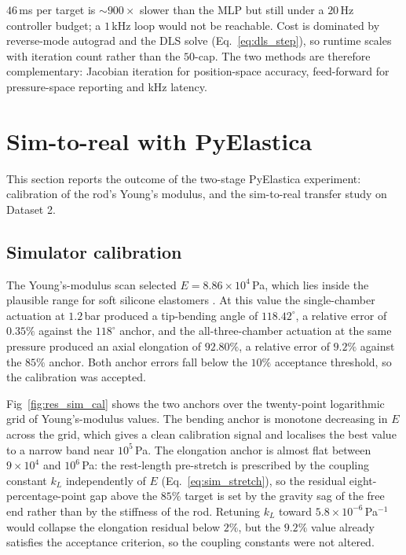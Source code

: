 $46$\,ms per target is $\sim$$900\times$ slower than the MLP but still under a $20$\,Hz controller budget; a $1$\,kHz loop would not be reachable. Cost is dominated by reverse-mode autograd and the DLS solve (Eq.~\ref{eq:dls_step}), so runtime scales with iteration count rather than the $50$-cap. The two methods are therefore complementary: Jacobian iteration for position-space accuracy, feed-forward for pressure-space reporting and kHz latency.

\section{Sim-to-real with PyElastica}
\label{sec:res_sim}

This section reports the outcome of the two-stage PyElastica experiment: calibration of the rod's Young's modulus, and the sim-to-real transfer study on Dataset 2.

\subsection{Simulator calibration}
\label{sec:res_sim_cal}

The Young's-modulus scan selected $E = 8.86 \times 10^{4}$\,Pa, which lies inside the plausible range for soft silicone elastomers \cite{manti2016soft}. At this value the single-chamber actuation at $1.2$\,bar produced a tip-bending angle of $118.42^{\circ}$, a relative error of $0.35\%$ against the $118^{\circ}$ anchor, and the all-three-chamber actuation at the same pressure produced an axial elongation of $92.80\%$, a relative error of $9.2\%$ against the $85\%$ anchor. Both anchor errors fall below the $10\%$ acceptance threshold, so the calibration was accepted.

Fig~\ref{fig:res_sim_cal} shows the two anchors over the twenty-point logarithmic grid of Young's-modulus values. The bending anchor is monotone decreasing in $E$ across the grid, which gives a clean calibration signal and localises the best value to a narrow band near $10^{5}$\,Pa. The elongation anchor is almost flat between $9 \times 10^{4}$ and $10^{6}$\,Pa: the rest-length pre-stretch is prescribed by the coupling constant $k_L$ independently of $E$ (Eq.~\eqref{eq:sim_stretch}), so the residual eight-percentage-point gap above the $85\%$ target is set by the gravity sag of the free end rather than by the stiffness of the rod. Retuning $k_L$ toward $5.8 \times 10^{-6}$\,Pa$^{-1}$ would collapse the elongation residual below $2\%$, but the $9.2\%$ value already satisfies the acceptance criterion, so the coupling constants were not altered.

